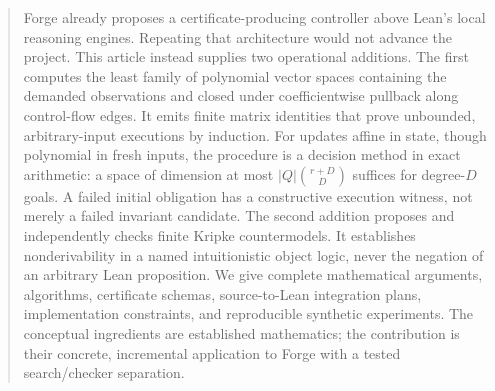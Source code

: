 \documentclass[11pt,letterpaper]{article}
\theoremstyle{definition}\newtheorem{definition}[theorem]{Definition}
\theoremstyle{remark}\newtheorem{remark}[theorem]{Remark}
\begin{document}
\begin{abstract}
Forge already proposes a certificate-producing controller above Lean's local
reasoning engines. Repeating that architecture would not advance the project.
This article instead supplies two operational additions. The first computes the
least family of polynomial vector spaces containing the demanded observations
and closed under coefficientwise pullback along control-flow edges. It emits
finite matrix identities that prove unbounded, arbitrary-input executions by
induction. For updates affine in state, though polynomial in fresh inputs, the
procedure is a decision method in exact arithmetic: a space of dimension at
most $|Q|\binom{r+D}{D}$ suffices for degree-$D$ goals. A failed initial
obligation has a constructive execution witness, not merely a failed invariant
candidate. The second addition proposes and independently checks finite Kripke
countermodels. It establishes nonderivability in a named intuitionistic object
logic, never the negation of an arbitrary Lean proposition. We give complete
mathematical arguments, algorithms, certificate schemas, source-to-Lean
integration plans, implementation constraints, and reproducible synthetic
experiments. The conceptual ingredients are established mathematics; the
contribution is their concrete, incremental application to Forge with a tested
search/checker separation.
\end{abstract}
\tableofcontents
\newpage










\appendix

\clearpage


\end{document}
